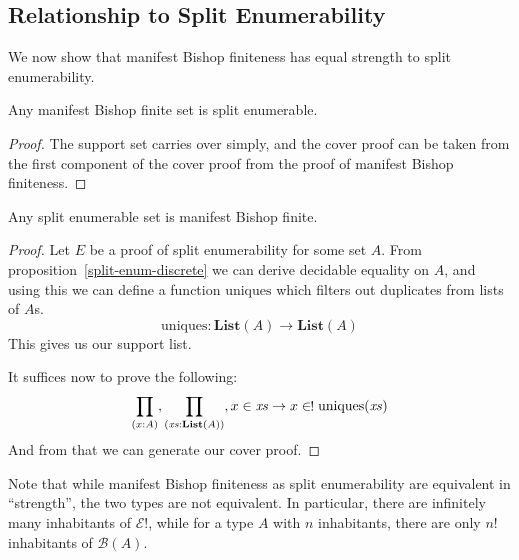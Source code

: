 \subsection{Relationship to Split Enumerability}
We now show that manifest Bishop finiteness has equal strength to split
enumerability.
\begin{rm-lemma}
  Any manifest Bishop finite set is split enumerable.
\end{rm-lemma}
\begin{proof}
  The support set carries over simply, and the cover proof can be taken from the
  first component of the cover proof from the proof of manifest Bishop
  finiteness.
\end{proof}
\begin{rm-theorem} \label{split-enum-to-manifest-bishop}
  Any split enumerable set is manifest Bishop finite.
\end{rm-theorem}
\begin{proof}
  Let \(E\) be a proof of split enumerability for some set \(A\).
  From proposition~\ref{split-enum-discrete} we can derive decidable equality on
  \(A\), and using this we can define a function \(\text{uniques}\) which filters
  out duplicates from lists of \(A\)s.
  \begin{equation}
    \text{uniques} : \textbf{List}(A) \rightarrow \textbf{List}(A)
  \end{equation}
  This gives us our support list.

  It suffices now to prove the following:
  \begin{equation}
    \prod_{(x : A)} , \prod_{(\mathit{xs} : \textbf{List}(A))} , x \in \mathit{xs} \rightarrow x \inunique \text{uniques}(\mathit{xs})
  \end{equation}
  And from that we can generate our cover proof.
\end{proof}
Note that while manifest Bishop finiteness as split enumerability are equivalent
in ``strength'', the two types are not equivalent.
In particular, there are infinitely many inhabitants of \(\mathcal{E}!\), while
for a type \(A\) with \(n\) inhabitants, there are only \(n!\) inhabitants of
\(\mathcal{B}(A)\).
